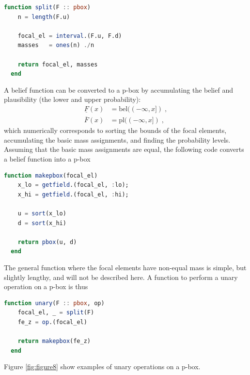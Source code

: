 \documentclass{juliacon}
\begin{document}
\begin{lstlisting}[language = Julia]
  function split(F :: pbox)
    n = length(F.u)

    focal_el = interval.(F.u, F.d)
    masses   = ones(n) ./n

    return focal_el, masses
  end
\end{lstlisting}
\noindent A belief function can be converted to a p-box by accumulating the belief and plausibility (the lower and upper probability):
\begin{align*}
  \underline{F}(x) &= \text{bel}((-\infty, x])\;,\\ 
  \overline{F}(x) &= \text{pl}((-\infty, x])\;,
\end{align*}
\noindent which numerically corresponds to sorting the bounds of the focal elements, accumulating the basic mass assignments, and finding the probability levels. Assuming that the basic mass assignments are equal, the following code converts a belief function into a p-box
\begin{lstlisting}[language = Julia]
  function makepbox(focal_el)
    x_lo = getfield.(focal_el, :lo);
    x_hi = getfield.(focal_el, :hi);

    u = sort(x_lo)
    d = sort(x_hi)

    return pbox(u, d)
  end
\end{lstlisting}
\noindent The general function where the focal elements have non-equal mass is simple, but slightly lengthy, and will not be described here. A function to perform a unary operation on a p-box is thus
\begin{lstlisting}[language = Julia]
  function unary(F :: pbox, op)
    focal_el, _ = split(F)
    fe_z = op.(focal_el)

    return makepbox(fe_z)
  end
\end{lstlisting}
Figure \ref{fig:figure8} show examples of unary operations on a p-box.
\end{document}
